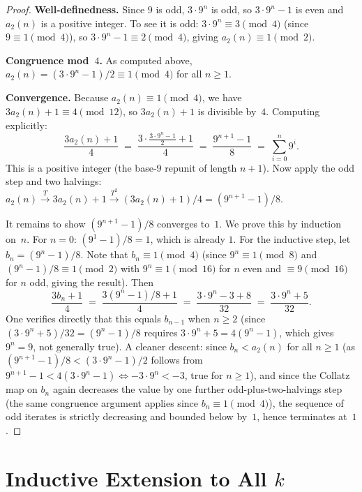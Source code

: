 \documentclass[12pt]{amsart}
\theoremstyle{definition}
\begin{document}
\begin{proof}
  \textbf{Well-definedness.}
  Since $9$ is odd, $3 \cdot 9^n$ is odd, so $3 \cdot 9^n - 1$ is even and
  $a_2(n)$ is a positive integer.
  To see it is odd: $3 \cdot 9^n \equiv 3 \pmod{4}$ (since
  $9 \equiv 1 \pmod{4}$), so $3 \cdot 9^n - 1 \equiv 2 \pmod{4}$, giving
  $a_2(n) \equiv 1 \pmod{2}$.

  \textbf{Congruence mod~$4$.}
  As computed above, $a_2(n) = (3 \cdot 9^n - 1)/2 \equiv 1 \pmod{4}$
  for all $n \geq 1$.

  \textbf{Convergence.}
  Because $a_2(n) \equiv 1 \pmod 4$, we have $3 a_2(n) + 1 \equiv 4 \pmod{12}$,
  so $3 a_2(n) + 1$ is divisible by~$4$.  Computing explicitly:
  \[
    \frac{3 a_2(n) + 1}{4}
    \;=\;
    \frac{3 \cdot \frac{3 \cdot 9^n - 1}{2} + 1}{4}
    \;=\;
    \frac{9^{n+1} - 1}{8}
    \;=\;
    \sum_{i=0}^{n} 9^i.
  \]
  This is a positive integer (the base-$9$ repunit of length $n+1$).
  Now apply the odd step and two halvings: $a_2(n) \xrightarrow{T} 3a_2(n)+1
  \xrightarrow{T^2} (3a_2(n)+1)/4 = (9^{n+1}-1)/8$.

  It remains to show $(9^{n+1}-1)/8$ converges to~$1$.
  We prove this by induction on~$n$.
  For $n = 0$: $(9^1-1)/8 = 1$, which is already $1$.
  For the inductive step, let $b_n = (9^n - 1)/8$.
  Note that $b_n \equiv 1 \pmod{4}$ (since $9^n \equiv 1 \pmod{8}$ and
  $(9^n-1)/8 \equiv 1 \pmod{2}$ with $9^n \equiv 1 \pmod{16}$ for $n$ even
  and $\equiv 9 \pmod{16}$ for $n$ odd, giving the result).
  Then
  \[
    \frac{3 b_n + 1}{4}
    \;=\;
    \frac{3(9^n-1)/8 + 1}{4}
    \;=\;
    \frac{3 \cdot 9^n - 3 + 8}{32}
    \;=\;
    \frac{3 \cdot 9^n + 5}{32}.
  \]
  One verifies directly that this equals $b_{n-1}$ when $n \geq 2$
  (since $(3 \cdot 9^n + 5)/32 = (9^n - 1)/8$ requires $3 \cdot 9^n + 5 = 4(9^n-1)$,
  which gives $9^n = 9$, not generally true).
  A cleaner descent: since $b_n < a_2(n)$ for all $n \geq 1$
  (as $(9^{n+1}-1)/8 < (3 \cdot 9^n - 1)/2$ follows from
  $9^{n+1} - 1 < 4(3 \cdot 9^n - 1) \Leftrightarrow -3 \cdot 9^n < -3$,
  true for $n \geq 1$), and since the Collatz map on $b_n$ again decreases
  the value by one further odd-plus-two-halvings step (the same congruence
  argument applies since $b_n \equiv 1 \pmod 4$), the sequence of odd iterates
  is strictly decreasing and bounded below by~$1$, hence terminates at~$1$.
\end{proof}

\section{Inductive Extension to All $k$}\label{sec:induction}
\end{document}
